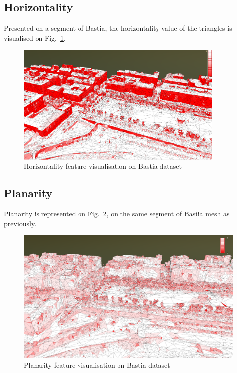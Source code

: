 \documentclass{kththesis}
\begin{document}
\subsection{Horizontality}
Presented on a segment of Bastia, the horizontality value of the triangles is visualised on Fig.~\ref{fig:bastia_horizontality}. 

\begin{figure}[H]
    \centering
    \includegraphics[width=0.9\textwidth]{images/features/horizontality_bastia.png}
    \caption{Horizontality feature visualisation on Bastia dataset}
    \label{fig:bastia_horizontality}
\end{figure}

\subsection{Planarity}
Planarity is represented on Fig.~\ref{fig:bastia_planarity}, on the same segment of Bastia mesh as previously.
\begin{figure}[H]
    \centering
    \includegraphics[width=\textwidth]{images/features/planarity_bastia.png}
    \caption{Planarity feature visualisation on Bastia dataset}
    \label{fig:bastia_planarity}
\end{figure}
\end{document}
